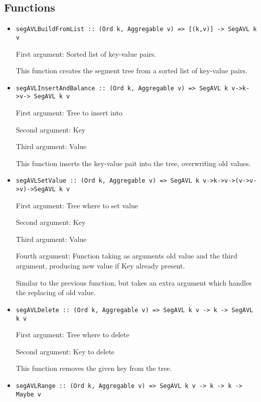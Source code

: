 \documentclass[a4paper,10pt,openany]{article}
\begin{document}
\subsection*{Functions}
\begin{itemize}
\item \begin{lstlisting}
segAVLBuildFromList :: (Ord k, Aggregable v) => [(k,v)] -> SegAVL k v
\end{lstlisting}
First argument: Sorted list of key-value pairs.

This function creates the segment tree from a sorted list of key-value pairs.
\item \begin{lstlisting}
segAVLInsertAndBalance :: (Ord k, Aggregable v) => SegAVL k v->k->v-> SegAVL k v
\end{lstlisting}
First argument: Tree to insert into

Second argument: Key

Third argument: Value

This function inserts the key-value pait into the tree, overwriting old values.
\item \begin{lstlisting}
segAVLSetValue :: (Ord k, Aggregable v) => SegAVL k v->k->v->(v->v->v)->SegAVL k v
\end{lstlisting}

First argument: Tree where to set value

Second argument: Key

Third argument: Value

Fourth argument: Function taking as arguments old value and the third argument, producing new value if Key already present.

Similar to the previous function, but takes an extra argument which handles the replacing of old value.
\item \begin{lstlisting}
segAVLDelete :: (Ord k, Aggregable v) => SegAVL k v -> k -> SegAVL k v
\end{lstlisting}

First argument: Tree where to delete

Second argument: Key to delete

This function removes the given key from the tree.
\item \begin{lstlisting}
segAVLRange :: (Ord k, Aggregable v) => SegAVL k v -> k -> k -> Maybe v
\end{lstlisting}


\end{itemize}
\end{document}
